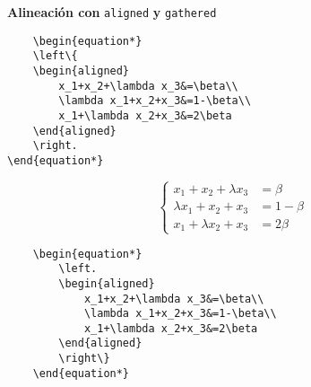 \documentclass[12pt]{book}
\numberwithin{equation}{section}
\theoremstyle{plain}  %
\begin{document}
\makeatletter	
\def\@roman#1{\romannumeral#1}
\makeatother
\renewcommand{\baselinestretch}{1.5}%
\renewcommand{\thefootnote}{\arabic{footnote}} %
\renewcommand{\refname}{Referencias bibliográficas}
\newcommand{\tto}{\longrightarrow}
\newcommand{\N}{\ensuremath{\mathbb{N}}}
\newcommand{\parcial}[2]{\frac{\partial#1}{\partial#2}}
\newcommand{\Norma}[1]{\Vert#1\Vert}
\newcommand{\upla}[2]{(#1_1,#1_2,$\ldots$,#1_{#2})}
	\newcommand{\uplamatrix}[3]{
	\begin{pmatrix}  
		#1_{11} &  #1_{12}  & \cdots  &  #1_{1 #3} \\   
		#1_{21} &  #1_{22} &  \cdots  & #1_{2 #3}  \\ 
		\vdots     &  \vdots      & \vdots  & \vdots \\
	#1_{#2 1} & #1_{#2 2} &  \cdots &  #1_{#2 #3}
\end{pmatrix}}
	\newcommand{\kupla}[3][k]{
	(#2_{#3},$\ldots$ #2_{#1})	
}




\noindent\textbf{Alineación con } \verb*|aligned| \textbf{y} \verb*|gathered|


\begin{verbatim}
	\begin{equation*}
	\left\{
	\begin{aligned}
		x_1+x_2+\lambda x_3&=\beta\\
		\lambda x_1+x_2+x_3&=1-\beta\\
		x_1+\lambda x_2+x_3&=2\beta
	\end{aligned}
	\right.
\end{equation*}
\end{verbatim}

	\begin{equation*}
	\left\{
	\begin{aligned}
		x_1+x_2+\lambda x_3&=\beta\\
		\lambda x_1+x_2+x_3&=1-\beta\\
		x_1+\lambda x_2+x_3&=2\beta
	\end{aligned}
	\right.
\end{equation*}


\begin{verbatim}
	\begin{equation*}
		\left.
		\begin{aligned}
			x_1+x_2+\lambda x_3&=\beta\\
			\lambda x_1+x_2+x_3&=1-\beta\\
			x_1+\lambda x_2+x_3&=2\beta
		\end{aligned}
		\right\}
	\end{equation*}
\end{verbatim}
\end{document}
